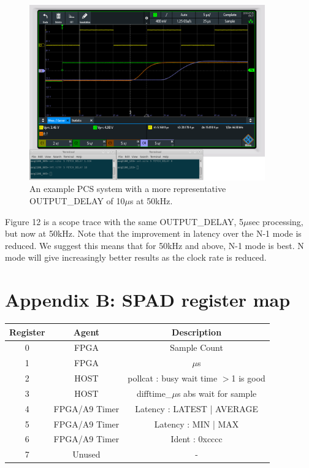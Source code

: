 \documentclass{article}
\begin{document}
\begin{figure}
	\centering
	\includegraphics[width=4.0in]{images/n-mode-pcs-scope-trace-50kHz.png}
	\caption{An example PCS system with a more representative OUTPUT\_DELAY of 10$\mu$s at 50kHz.}
	\label{}
\end{figure}

Figure 12 is a scope trace with the same OUTPUT\_DELAY, 5$\mu$sec processing, but now at 50kHz.
Note that the improvement in latency over the N-1 mode is reduced.
We suggest this means that for 50kHz and above, N-1 mode is best.
N mode will give increasingly better results as the clock rate is reduced.

\section{Appendix B: SPAD register map}

\begin{center}
	\begin{tabular}{||c c c||} 
		\hline
		Register & Agent & Description \\ \hline\hline\hline
		0 & FPGA & Sample Count \\
		\hline
		1 & FPGA & $\mu$s \\
		\hline
		2 & HOST & pollcat : busy wait time $>$1 is good \\
		\hline
		3 & HOST & difftime\_$\mu$s abs wait for sample \\ [1ex] 
		\hline
		4 & FPGA/A9 Timer & Latency : LATEST | AVERAGE \\
		\hline
		5 & FPGA/A9 Timer & Latency : MIN | MAX \\
		\hline
		6 & FPGA/A9 Timer & Ident : 0xcccc \\
		\hline
		7 & Unused & - \\
		\hline
	\end{tabular}
\end{center}
\end{document}
